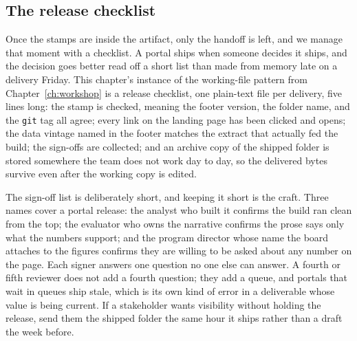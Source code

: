 \documentclass[
    a4paper,
    fontsize=10pt,
    twoside=true,
    numbers=noenddot,
]{kaobook}
\begin{document}
\subsection{The release checklist}\label{ch12-sc-release}
Once the stamps are inside the artifact, only the handoff is left, and we manage that moment with a checklist. A portal ships when someone decides it ships, and the decision goes better read off a short list than made from memory late on a delivery Friday. This chapter's instance of the working-file pattern from Chapter~\ref{ch:workshop} is a release checklist, one plain-text file per delivery, five lines long: the stamp is checked, meaning the footer version, the folder name, and the \texttt{git} tag all agree; every link on the landing page has been clicked and opens; the data vintage named in the footer matches the extract that actually fed the build; the sign-offs are collected; and an archive copy of the shipped folder is stored somewhere the team does not work day to day, so the delivered bytes survive even after the working copy is edited.

The sign-off list is deliberately short, and keeping it short is the craft. Three names cover a portal release: the analyst who built it confirms the build ran clean from the top; the evaluator who owns the narrative confirms the prose says only what the numbers support; and the program director whose name the board attaches to the figures confirms they are willing to be asked about any number on the page. Each signer answers one question no one else can answer. A fourth or fifth reviewer does not add a fourth question; they add a queue, and portals that wait in queues ship stale, which is its own kind of error in a deliverable whose value is being current. If a stakeholder wants visibility without holding the release, send them the shipped folder the same hour it ships rather than a draft the week before.
\end{document}
